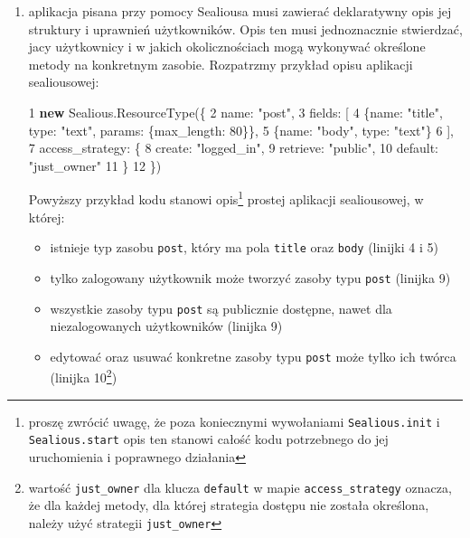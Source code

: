 \documentclass[12pt,polish,a4paper,]{report}
\newenvironment{Shaded}{}{}
\newcommand{\KeywordTok}[1]{\textcolor[rgb]{0.00,0.44,0.13}{\textbf{{#1}}}}
\newcommand{\DataTypeTok}[1]{\textcolor[rgb]{0.56,0.13,0.00}{{#1}}}
\newcommand{\DecValTok}[1]{\textcolor[rgb]{0.25,0.63,0.44}{{#1}}}
\newcommand{\StringTok}[1]{\textcolor[rgb]{0.25,0.44,0.63}{{#1}}}
\newcommand{\VariableTok}[1]{\textcolor[rgb]{0.10,0.09,0.49}{{#1}}}
\newcommand{\OperatorTok}[1]{\textcolor[rgb]{0.40,0.40,0.40}{{#1}}}
\newcommand{\AttributeTok}[1]{\textcolor[rgb]{0.49,0.56,0.16}{{#1}}}
\newcommand{\NormalTok}[1]{{#1}}
\providecommand{\tightlist}{%
  \setlength{\itemsep}{0pt}\setlength{\parskip}{0pt}}
\begin{document}
\begin{enumerate}
\def\labelenumi{\arabic{enumi}.}
\item
  aplikacja pisana przy pomocy Sealiousa musi zawierać deklaratywny opis
  jej struktury i uprawnień użytkowników. Opis ten musi jednoznacznie
  stwierdzać, jacy użytkownicy i w jakich okolicznościach mogą wykonywać
  określone metody na konkretnym zasobie. Rozpatrzmy przykład opisu
  aplikacji sealiousowej:

\begin{Shaded}
\begin{Highlighting}[]
 \DecValTok{1} \KeywordTok{new} \VariableTok{Sealious}\NormalTok{.}\AttributeTok{ResourceType}\NormalTok{(}\OperatorTok{\{}
 \DecValTok{2}    \DataTypeTok{name}\OperatorTok{:} \StringTok{"post"}\OperatorTok{,}
 \DecValTok{3}    \DataTypeTok{fields}\OperatorTok{:} \NormalTok{[}
 \DecValTok{4}        \OperatorTok{\{}\DataTypeTok{name}\OperatorTok{:} \StringTok{"title"}\OperatorTok{,} \DataTypeTok{type}\OperatorTok{:} \StringTok{"text"}\OperatorTok{,} \DataTypeTok{params}\OperatorTok{:} \OperatorTok{\{}\DataTypeTok{max_length}\OperatorTok{:} \DecValTok{80}\OperatorTok{\}\},}
 \DecValTok{5}        \OperatorTok{\{}\DataTypeTok{name}\OperatorTok{:} \StringTok{"body"}\OperatorTok{,} \DataTypeTok{type}\OperatorTok{:} \StringTok{"text"}\OperatorTok{\}}
 \DecValTok{6}   \NormalTok{]}\OperatorTok{,}
 \DecValTok{7}    \DataTypeTok{access_strategy}\OperatorTok{:} \OperatorTok{\{}
 \DecValTok{8}        \DataTypeTok{create}\OperatorTok{:} \StringTok{"logged_in"}\OperatorTok{,}
 \DecValTok{9}        \DataTypeTok{retrieve}\OperatorTok{:} \StringTok{"public"}\OperatorTok{,}
\DecValTok{10}        \DataTypeTok{default}\OperatorTok{:} \StringTok{"just_owner"}
\DecValTok{11}    \OperatorTok{\}}
\DecValTok{12} \OperatorTok{\}}\NormalTok{)}
\end{Highlighting}
\end{Shaded}

  Powyższy przykład kodu stanowi opis\footnote{proszę zwrócić uwagę, że
    poza koniecznymi wywołaniami \texttt{Sealious.init} i
    \texttt{Sealious.start} opis ten stanowi całość kodu potrzebnego do
    jej uruchomienia i poprawnego działania} prostej aplikacji
  sealiousowej, w której:

  \begin{itemize}
  \tightlist
  \item
    istnieje typ zasobu \texttt{post}, który ma pola \texttt{title} oraz
    \texttt{body} (linijki 4 i 5)
  \item
    tylko zalogowany użytkownik może tworzyć zasoby typu \texttt{post}
    (linijka 9)
  \item
    wszystkie zasoby typu \texttt{post} są publicznie dostępne, nawet
    dla niezalogowanych użytkowników (linijka 9)
  \item
    edytować oraz usuwać konkretne zasoby typu \texttt{post} może tylko
    ich twórca (linijka 10\footnote{wartość \texttt{just\_owner} dla
      klucza \texttt{default} w mapie \texttt{access\_strategy} oznacza,
      że dla każdej metody, dla której strategia dostępu nie została
      określona, należy użyć strategii \texttt{just\_owner}})
  \end{itemize}


\end{enumerate}
\end{document}
